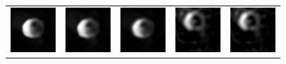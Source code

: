  
 
 
 \begin{figure}[b]
 	\begin{center}
 		\vspace{-.2in}
 		
% 		
% 			
% 			
% 			
% 			
% 			
% 			
% 			
 		
 		
 		
 		
 		\begin{tabular}{c c c c c}
 			
 			
 			\includegraphics[width=.19\linewidth]
 			{blackhole_chirp_1_shift.png} & 	\hspace{-.17in} \includegraphics[width=.19\linewidth]
 			{blackhole_celestial_shift.png} & 	\hspace{-.17in}
 			\includegraphics[width=.19\linewidth]
 			{blackhole_blackhole_shift.png}& 	\hspace{-.17in}
 			\includegraphics[width=.19\linewidth]
 			{blackhole_l2.png}& 	\hspace{-.17in} 
 			\includegraphics[width=.19\linewidth]
 			{blackhole_l08_lambda200.png} \\
 			

\end{tabular}
\end{center}
\end{figure}
